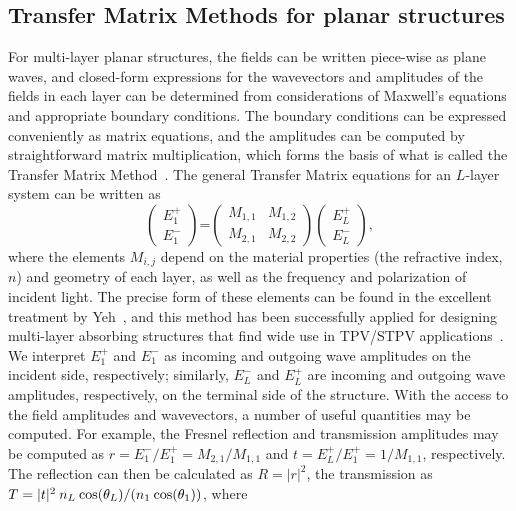 \documentclass[10pt,letterpaper]{article}
\begin{document}
\subsection{Transfer Matrix Methods for planar structures}
For multi-layer planar structures, the fields can be written piece-wise as plane waves, and closed-form expressions for the wavevectors
and amplitudes of the fields in each layer can be determined from considerations of Maxwell's equations and appropriate boundary
conditions.  The boundary conditions can be expressed conveniently as matrix equations, and the amplitudes can be computed by
straightforward matrix multiplication, which forms the basis of what is called the Transfer Matrix Method~\cite{Yeh}.  The general
Transfer Matrix equations for an $L$-layer system can be written as
\begin{equation}\label{Fresnel}
  \begin{pmatrix} E_1^+  \\ E_1^-  \end{pmatrix}
  \mbox{=}
  \begin{pmatrix}
  M_{1,1} & M_{1,2} \\
  M_{2,1} & M_{2,2}  \end{pmatrix}
  \begin{pmatrix} E_L^+ \\ E_L^-  \end{pmatrix},
\end{equation}
where the elements $M_{i,j}$ depend on the material properties (the refractive index, $n$) and geometry of each layer, as well as the
frequency and polarization of incident light.  The precise form of these elements can be found in the excellent treatment by Yeh~\cite{Yeh}, and this method 
has been successfully applied for designing multi-layer absorbing structures that find wide use in TPV/STPV applications~\cite{BN_JApplPhys_2005,LZ_JApplPhys_2006,FUS_OptExp_2015}.  We interpret $E_1^+$ and $E_1^-$
as incoming and outgoing wave amplitudes on the incident side, respectively; similarly, $E_L^-$ and $E_L^+$ are incoming and outgoing wave amplitudes, respectively,
on the terminal side of the structure.  With the access to the field amplitudes and wavevectors, a number of useful quantities may be computed.
For example, the Fresnel reflection and transmission amplitudes may be computed as $r =  E_1^-/E_1^+  =  M_{2,1}/M_{1,1}$  and
$t = E_L^+/E_1^+ =  1/M_{1,1}$, respectively.  
The reflection can then be calculated as $R=|r|^2$, the transmission as
$T= |t|^2 \: n_L \: {\rm cos}(\theta_L)/(n_1 \: {\rm cos}(\theta_1))$, where 
\end{document}
